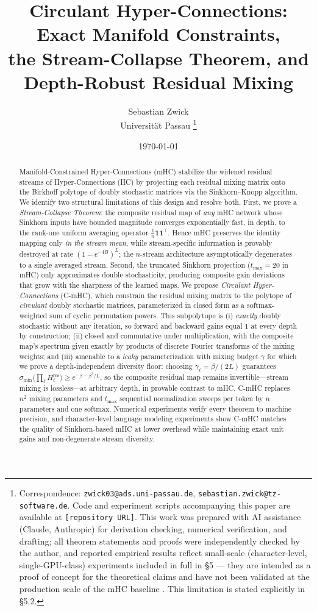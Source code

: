 \documentclass[11pt]{article}
\title{\textbf{Circulant Hyper-Connections: Exact Manifold Constraints,\\ the Stream-Collapse Theorem, and Depth-Robust Residual Mixing}}
\author{Sebastian Zwick\\ \normalsize Universität Passau \thanks{Correspondence: \texttt{zwick03@ads.uni-passau.de}, \texttt{sebastian.zwick@tz-software.de}. Code and experiment scripts accompanying this paper are available at \texttt{[repository URL]}. This work was prepared with AI assistance (Claude, Anthropic) for derivation checking, numerical verification, and drafting; all theorem statements and proofs were independently checked by the author, and reported empirical results reflect small-scale (character-level, single-GPU-class) experiments included in full in \S5 --- they are intended as a proof of concept for the theoretical claims and have not been validated at the production scale of the mHC baseline \citep{xie2025mhc}. This limitation is stated explicitly in \S5.2.}}
\date{\today}
\newcommand{\ones}{\mathbf{1}}
\newcommand{\Hres}{H^{\mathrm{res}}}
\begin{document}
\maketitle

\begin{abstract}
Manifold-Constrained Hyper-Connections (mHC) \citep{xie2025mhc} stabilize the widened residual streams of Hyper-Connections (HC) \citep{zhu2024hc} by projecting each residual mixing matrix onto the Birkhoff polytope of doubly stochastic matrices via the Sinkhorn--Knopp algorithm. We identify two structural limitations of this design and resolve both. First, we prove a \emph{Stream-Collapse Theorem}: the composite residual map of \emph{any} mHC network whose Sinkhorn inputs have bounded magnitude converges exponentially fast, in depth, to the rank-one uniform averaging operator $\frac1n\ones\ones^{\!\top}$. Hence mHC preserves the identity mapping only \emph{in the stream mean}, while stream-specific information is provably destroyed at rate $(1-e^{-4B})^{L}$; the $n$-stream architecture asymptotically degenerates to a single averaged stream. Second, the truncated Sinkhorn projection ($t_{\max}=20$ in mHC) only approximates double stochasticity, producing composite gain deviations that grow with the sharpness of the learned maps. We propose \emph{Circulant Hyper-Connections} (C-mHC), which constrain the residual mixing matrix to the polytope of \emph{circulant} doubly stochastic matrices, parameterized in closed form as a softmax-weighted sum of cyclic permutation powers. This subpolytope is (i) \emph{exactly} doubly stochastic without any iteration, so forward and backward gains equal $1$ at every depth by construction; (ii) closed and commutative under multiplication, with the composite map's spectrum given exactly by products of discrete Fourier transforms of the mixing weights; and (iii) amenable to a \emph{leaky} parameterization with mixing budget $\gamma$ for which we prove a depth-independent diversity floor: choosing $\gamma_\ell=\beta/(2L)$ guarantees $\sigma_{\min}\!\big(\prod_{\ell}\Hres_\ell\big)\ge e^{-\beta-\beta^2/L}$, so the composite residual map remains invertible---stream mixing is lossless---at arbitrary depth, in provable contrast to mHC. C-mHC replaces $n^2$ mixing parameters and $t_{\max}$ sequential normalization sweeps per token by $n$ parameters and one softmax. Numerical experiments verify every theorem to machine precision, and character-level language modeling experiments show C-mHC matches the quality of Sinkhorn-based mHC at lower overhead while maintaining exact unit gains and non-degenerate stream diversity.
\end{abstract}
\end{document}
